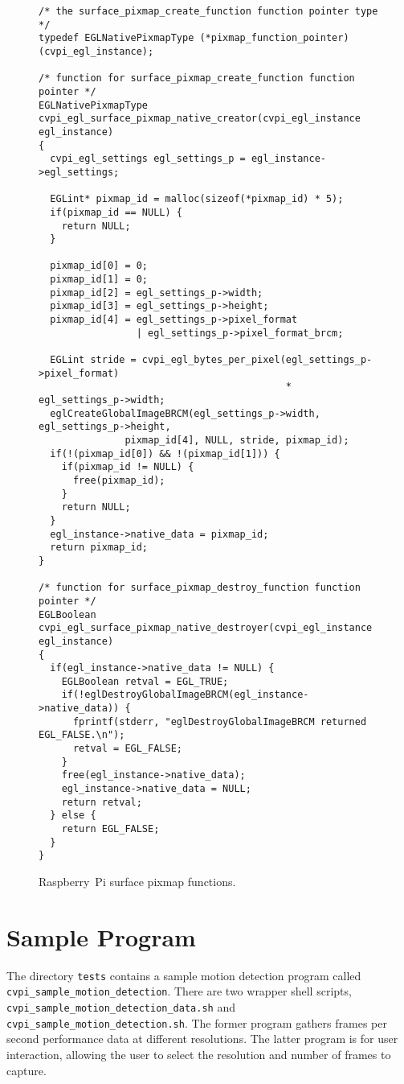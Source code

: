 \documentclass[12pt]{report}
\begin{document}
\begin{figure}[H]
\begin{lstlisting}[frame=single, basicstyle=\footnotesize]
/* the surface_pixmap_create_function function pointer type */
typedef EGLNativePixmapType (*pixmap_function_pointer)(cvpi_egl_instance);

/* function for surface_pixmap_create_function function pointer */
EGLNativePixmapType
cvpi_egl_surface_pixmap_native_creator(cvpi_egl_instance egl_instance)
{
  cvpi_egl_settings egl_settings_p = egl_instance->egl_settings;

  EGLint* pixmap_id = malloc(sizeof(*pixmap_id) * 5);
  if(pixmap_id == NULL) {
    return NULL;
  }

  pixmap_id[0] = 0;
  pixmap_id[1] = 0;
  pixmap_id[2] = egl_settings_p->width;
  pixmap_id[3] = egl_settings_p->height;
  pixmap_id[4] = egl_settings_p->pixel_format
                 | egl_settings_p->pixel_format_brcm;

  EGLint stride = cvpi_egl_bytes_per_pixel(egl_settings_p->pixel_format)
                                           * egl_settings_p->width;
  eglCreateGlobalImageBRCM(egl_settings_p->width, egl_settings_p->height,
			   pixmap_id[4], NULL, stride, pixmap_id);
  if(!(pixmap_id[0]) && !(pixmap_id[1])) {
    if(pixmap_id != NULL) {
      free(pixmap_id);
    }
    return NULL;
  }
  egl_instance->native_data = pixmap_id;
  return pixmap_id;
}

/* function for surface_pixmap_destroy_function function pointer */
EGLBoolean
cvpi_egl_surface_pixmap_native_destroyer(cvpi_egl_instance egl_instance)
{
  if(egl_instance->native_data != NULL) {
    EGLBoolean retval = EGL_TRUE;
    if(!eglDestroyGlobalImageBRCM(egl_instance->native_data)) {
      fprintf(stderr, "eglDestroyGlobalImageBRCM returned EGL_FALSE.\n");
      retval = EGL_FALSE;
    }
    free(egl_instance->native_data);
    egl_instance->native_data = NULL;
    return retval;
  } else {
    return EGL_FALSE;
  }
}
\end{lstlisting}
  \caption{Raspberry~Pi surface pixmap functions.}
  \label{surfacepixmap}
\end{figure}
\chapter{Sample Program}
The directory {\tt tests} contains a sample motion detection program
called {\tt cvpi\_sample\-\_motion\_detection}. There are two wrapper
shell scripts, {\tt cvpi\_sample\-\_motion\_detection\-\_data.sh} and
{\tt cvpi\_sample\-\_motion\_detection.sh}. The former program gathers
frames per second performance data at different resolutions. The
latter program is for user interaction, allowing the user to select
the resolution and number of frames to capture.
\end{document}
